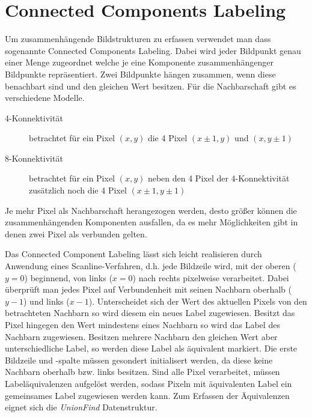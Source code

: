 \section*{Connected Components Labeling}

Um zusammenhängende Bildstrukturen zu erfassen verwendet man dass sogenannte Connected Components Labeling.
Dabei wird jeder Bildpunkt genau einer Menge zugeordnet welche je eine Komponente zusammenhängenger Bildpunkte repräsentiert.
Zwei Bildpunkte hängen zusammen, wenn diese benachbart sind und den gleichen Wert besitzen.
Für die Nachbarschaft gibt es verschiedene Modelle.

\begin{description}
\item[4-Konnektivität] betrachtet für ein Pixel $(x,y)$ die 4 Pixel $(x\pm1,y)$ und $(x,y\pm1)$
\item[8-Konnektivität] betrachtet für ein Pixel $(x,y)$ neben den 4 Pixel der 4-Konnektivität zusätzlich noch die 4 Pixel $(x\pm1,y\pm1)$
\end{description}
Je mehr Pixel als Nachbarschaft herangezogen werden, desto größer können die zusammenhängenden Komponenten ausfallen, da es mehr Möglichkeiten gibt in denen zwei Pixel als verbunden gelten.

Das Connected Component Labeling lässt sich leicht realisieren durch Anwendung eines Scanline-Verfahren, d.h. jede Bildzeile wird, mit der oberen ($y=0$) beginnend, von links ($x=0$) nach rechts pixelweise verarbeitet.
Dabei überprüft man jedes Pixel auf Verbundenheit mit seinen Nachbarn oberhalb ($y-1$) und links ($x-1$).
Unterscheidet sich der Wert des aktuellen Pixels von den betrachteten Nachbarn so wird diesem ein neues Label zugewiesen.
Besitzt das Pixel hingegen den Wert mindestens eines Nachbarn so wird das Label des Nachbarn zugewiesen.
Besitzen mehrere Nachbarn den gleichen Wert aber unterschiedliche Label, so werden diese Label als äquivalent markiert.
Die erste Bildzeile und -spalte müssen gesondert initialisert werden, da diese keine Nachbarn oberhalb bzw. links besitzen.
Sind alle Pixel verarbeitet, müssen Labeläquivalenzen aufgelöst werden, sodass Pixeln mit äquivalenten Label ein gemeinsames Label zugewiesen werden kann. Zum Erfassen der Äquivalenzen eignet sich die \emph{UnionFind} Datenstruktur.

